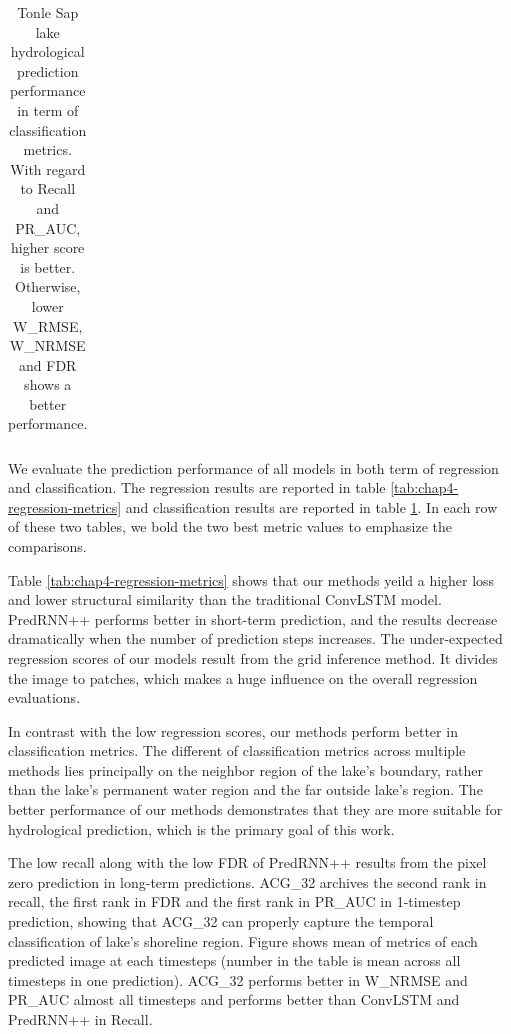 \begin{table}[h]
\begin{tabular}{|c|c|c|c|c|c|}
    \end{tabular}
    \caption[]{Tonle Sap lake hydrological prediction performance in term of classification metrics. With regard to Recall and PR\_AUC, higher score is better. Otherwise, lower W\_RMSE, W\_NRMSE and FDR shows a better performance.}
    \label{tab:chap4-classification-metrics}
\end{table}

We evaluate the prediction performance of all models in both term of regression and classification. The regression results are reported in table \ref{tab:chap4-regression-metrics} and classification results are reported in table \ref{tab:chap4-classification-metrics}. In each row of these two tables, we bold the two best metric values to emphasize the comparisons.

Table \ref{tab:chap4-regression-metrics} shows that our methods yeild a higher loss and lower structural similarity than the traditional ConvLSTM model. PredRNN++ performs better in short-term prediction, and the results decrease dramatically when the number of prediction steps increases. The under-expected regression scores of our models result from the grid inference method. It divides the image to patches, which makes a huge influence on the overall regression evaluations.

In contrast with the low regression scores, our methods perform better in classification metrics. The different of classification metrics across multiple methods lies principally on the neighbor region of the lake's boundary, rather than the lake's permanent water region and the far outside lake's region. The better performance of our methods demonstrates that they are more suitable for hydrological prediction, which is the primary goal of this work.

The low recall along with the low FDR of PredRNN++ results from the pixel zero prediction in long-term predictions. ACG\_32 archives the second rank in recall, the first rank in FDR and the first rank in PR\_AUC in 1-timestep prediction, showing that ACG\_32 can properly capture the temporal classification of lake's shoreline region. Figure shows mean of metrics of each predicted image at each timesteps (number  in the table is mean across all timesteps in one prediction). ACG\_32 performs better in W\_NRMSE and PR\_AUC almost all timesteps and performs better than ConvLSTM and PredRNN++ in Recall.

